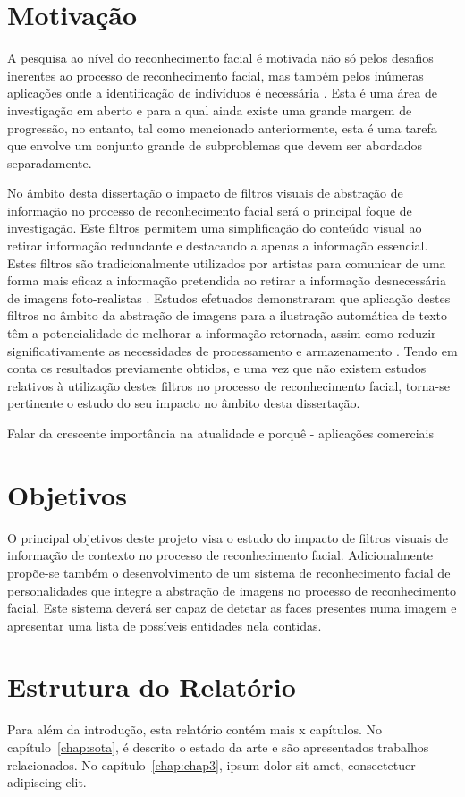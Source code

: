 \section{Motivação} \label{sec:motivation}
A pesquisa ao nível do reconhecimento facial é motivada não só pelos desafios inerentes ao processo de reconhecimento facial, mas também pelos inúmeras aplicações onde a identificação de indivíduos é necessária \citep{Li2011}. Esta é uma área de investigação em aberto e para a qual ainda existe uma grande margem de progressão, no entanto, tal como mencionado anteriormente, esta é uma tarefa que envolve um conjunto grande de subproblemas que devem ser abordados separadamente.

No âmbito desta dissertação o impacto de filtros visuais de abstração de informação no processo de reconhecimento facial será o principal foque de investigação. Este filtros permitem uma simplificação do conteúdo visual ao retirar informação redundante e destacando a apenas a informação essencial. Estes filtros são tradicionalmente utilizados por artistas para comunicar de uma forma mais eficaz a informação pretendida ao retirar a informação desnecessária de imagens foto-realistas \citep{Kyprianidis2009}. Estudos efetuados demonstraram que aplicação destes filtros no âmbito da abstração de imagens para a ilustração automática de texto têm a potencialidade de melhorar a informação retornada, assim como reduzir significativamente as necessidades de processamento e armazenamento \citep{Coelho2012}. Tendo em conta os resultados previamente obtidos, e uma vez que não existem estudos relativos à utilização destes filtros no processo de reconhecimento facial, torna-se pertinente o estudo do seu impacto no âmbito desta dissertação.

Falar da crescente importância na atualidade e porquê - aplicações comerciais

\section{Objetivos} \label{sec:goals}
O principal objetivos deste projeto visa o estudo do impacto de filtros visuais de informação de contexto no processo de reconhecimento facial.
Adicionalmente propõe-se também o desenvolvimento de um sistema de reconhecimento facial de personalidades que integre a abstração de imagens no processo de reconhecimento facial. Este sistema deverá ser capaz de detetar as faces presentes numa imagem e apresentar uma lista de possíveis entidades nela contidas.

\section{Estrutura do Relatório} \label{sec:struct}

Para além da introdução, esta relatório contém mais x capítulos.
No capítulo~\ref{chap:sota}, é descrito o estado da arte e são
apresentados trabalhos relacionados. 
No capítulo~\ref{chap:chap3}, ipsum dolor sit amet, consectetuer
adipiscing elit.
